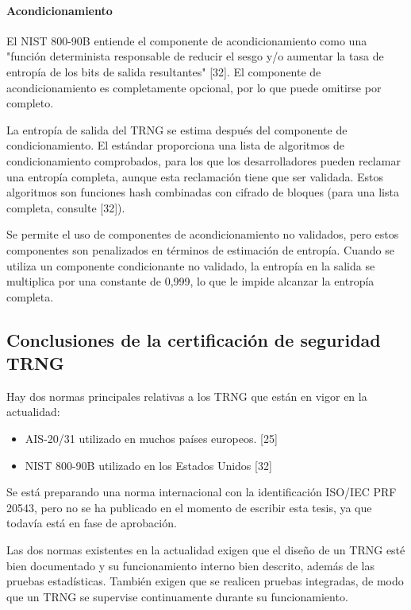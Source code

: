 		\paragraph{Acondicionamiento\\}
		
		El NIST 800-90B entiende el componente de acondicionamiento como una "función determinista responsable de reducir el sesgo y/o aumentar la tasa de entropía de los bits de salida resultantes" [32]. El componente de acondicionamiento es completamente opcional, por lo que puede omitirse por completo.
		
		La entropía de salida del TRNG se estima después del componente de condicionamiento. El estándar proporciona una lista de algoritmos de condicionamiento comprobados, para los que los desarrolladores pueden reclamar una entropía completa, aunque esta reclamación tiene que ser validada. Estos algoritmos son funciones hash combinadas con cifrado de bloques (para una lista completa, consulte [32]).
		
		Se permite el uso de componentes de acondicionamiento no validados, pero estos componentes son penalizados en términos de estimación de entropía. Cuando se utiliza un componente condicionante no validado, la entropía en la salida se multiplica por una constante de 0,999, lo que le impide alcanzar la entropía completa.
		
		\subsection{Conclusiones de la certificación de seguridad TRNG}
		
		Hay dos normas principales relativas a los TRNG que están en vigor en la actualidad:
		
		\begin{itemize}[noitemsep]
			\item AIS-20/31 utilizado en muchos países europeos. [25]
			\item NIST 800-90B utilizado en los Estados Unidos [32]
		\end{itemize}
	
	Se está preparando una norma internacional con la identificación ISO/IEC PRF 20543, pero no se ha publicado en el momento de escribir esta tesis, ya que todavía está en fase de aprobación.
	
	Las dos normas existentes en la actualidad exigen que el diseño de un TRNG esté bien documentado y su funcionamiento interno bien descrito, además de las pruebas estadísticas. También exigen que se realicen pruebas integradas, de modo que un TRNG se supervise continuamente durante su funcionamiento.
	

